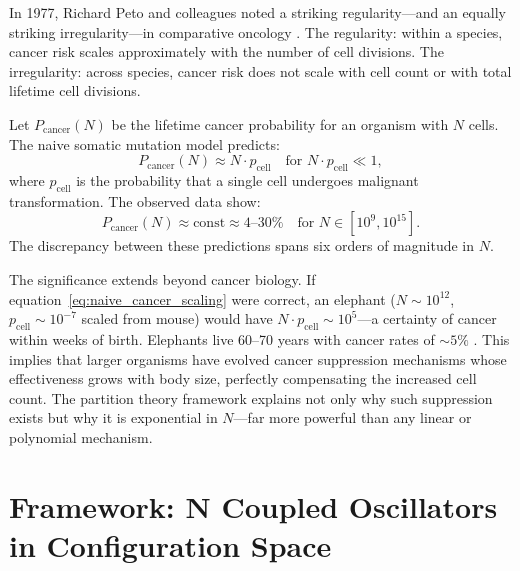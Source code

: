 In 1977, Richard Peto and colleagues noted a striking regularity---and an
equally striking irregularity---in comparative oncology \citep{peto1977}. The
regularity: within a species, cancer risk scales approximately with the number
of cell divisions. The irregularity: across species, cancer risk does not scale
with cell count or with total lifetime cell divisions.

\begin{definition}
\label{def:petos_paradox}
Let $P_{\mathrm{cancer}}(N)$ be the lifetime cancer probability for an organism
with $N$ cells. The naive somatic mutation model predicts:
\begin{equation}
  P_{\mathrm{cancer}}(N) \approx N \cdot p_{\mathrm{cell}}
  \quad \text{for } N \cdot p_{\mathrm{cell}} \ll 1,
  \label{eq:naive_cancer_scaling}
\end{equation}
where $p_{\mathrm{cell}}$ is the probability that a single cell undergoes
malignant transformation. The observed data show:
\begin{equation}
  P_{\mathrm{cancer}}(N) \approx \mathrm{const} \approx 4\text{--}30\%
  \quad \text{for } N \in [10^9, 10^{15}].
  \label{eq:peto_observed}
\end{equation}
The discrepancy between these predictions spans six orders of magnitude in $N$.
\end{definition}

The significance extends beyond cancer biology. If equation~\eqref{eq:naive_cancer_scaling}
were correct, an elephant ($N \sim 10^{12}$, $p_{\mathrm{cell}} \sim 10^{-7}$
scaled from mouse) would have $N \cdot p_{\mathrm{cell}} \sim 10^5$---a
certainty of cancer within weeks of birth. Elephants live 60--70 years with
cancer rates of $\sim 5\%$ \citep{abegglen2015}. This implies that larger
organisms have evolved cancer suppression mechanisms whose effectiveness grows
with body size, perfectly compensating the increased cell count. The partition
theory framework explains not only why such suppression exists but why it is
exponential in $N$---far more powerful than any linear or polynomial mechanism.

\section{Framework: N Coupled Oscillators in Configuration Space}
\label{sec:peto_framework}

